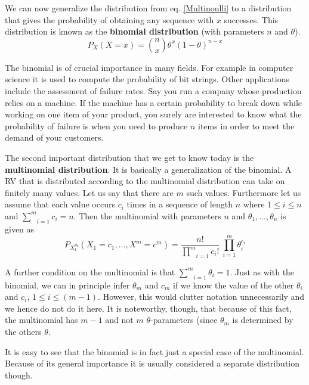 \documentclass[a4paper,11pt,leqno]{report}
\begin{document}
We can now generalize the distribution from eq. \ref{Multinoulli} to a distribution that gives the probability of obtaining any sequence
with $ x $ successes. This distribution is known as the \textbf{binomial distribution} (with parameters $ n $ and $ \theta $).
\begin{equation}
P_{X}(X=x) = \binom{n}{x} \theta^{x} (1-\theta)^{n-x}
\end{equation}

The binomial is of crucial importance in many fields. For example in computer science it is used to compute the probability of bit strings.
Other applications include the assessment of failure rates. Say you run a company whose production relies on a machine. If the machine
has a certain probability to break down while working on one item of your product, you surely are interested to know what the probability
of failure is when you need to produce $ n $ items in order to meet the demand of your customers.

The second important distribution that we get to know today is the \textbf{multinomial distribution}. It is basically a generalization
of the binomial. A RV that is distributed according to the multinomial distribution can take on finitely many values. Let us say that
there are $ m $ such values. Furthermore let us assume that each value occurs $ c_{i} $ times in a sequence of length $ n $ where
$ 1 \leq i \leq n $ and $ \underset{i=1}{\overset{m}{\sum}}c_{i} = n $. Then the multinomial with parameters $ n $ and 
$ \theta_{1}, \ldots, \theta_{n} $ is given as 
\begin{equation}
P_{X_{1}^{m}}(X_{1}=c_{1}, \ldots, X^{m}=c^{m}) = \dfrac{n!}{\underset{i=1}{\overset{m}{\prod}}c_{i}!}~\underset{i=1}{\overset{m}{\prod}} \theta_{i}^{c_{i}}
\end{equation}

A further condition on the multinomial is that $ \underset{i=1}{\overset{m}{\sum}}\theta_{i} = 1 $. Just as with the binomial, we can
in principle infer $ \theta_{m} $ and $ c_{m} $ if we know the value of the other $ \theta_{i} $ and $ c_{i} $, $ 1 \leq i \leq (m-1) $. However, this would
clutter notation unnecessarily and we hence do not do it here. It is noteworthy, though, that because of this fact, the multinomial
has $ m-1 $ and not $ m $ $ \theta $-parameters (since $ \theta_{m} $ is determined by the others $ \theta $.

It is easy to see that the binomial is in fact just a special case of the multinomial. Because of its general importance it is usually
considered a separate distribution though.
\end{document}
